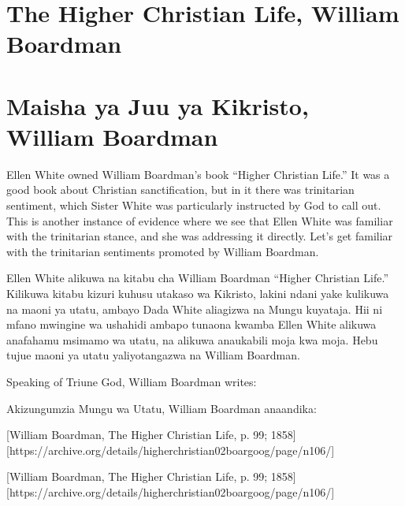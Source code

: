 \section*{The Higher Christian Life, William Boardman}


\section*{Maisha ya Juu ya Kikristo, William Boardman}


Ellen White owned William Boardman's book “Higher Christian Life.” It was a good book about Christian sanctification, but in it there was trinitarian sentiment, which Sister White was particularly instructed by God to call out. This is another instance of evidence where we see that Ellen White was familiar with the trinitarian stance, and she was addressing it directly. Let's get familiar with the trinitarian sentiments promoted by William Boardman.


Ellen White alikuwa na kitabu cha William Boardman “Higher Christian Life.” Kilikuwa kitabu kizuri kuhusu utakaso wa Kikristo, lakini ndani yake kulikuwa na maoni ya utatu, ambayo Dada White aliagizwa na Mungu kuyataja. Hii ni mfano mwingine wa ushahidi ambapo tunaona kwamba Ellen White alikuwa anafahamu msimamo wa utatu, na alikuwa anaukabili moja kwa moja. Hebu tujue maoni ya utatu yaliyotangazwa na William Boardman.


Speaking of Triune God, William Boardman writes:


Akizungumzia Mungu wa Utatu, William Boardman anaandika:


[William Boardman, The Higher Christian Life, p. 99; 1858][https://archive.org/details/higherchristian02boargoog/page/n106/]


[William Boardman, The Higher Christian Life, p. 99; 1858][https://archive.org/details/higherchristian02boargoog/page/n106/]


